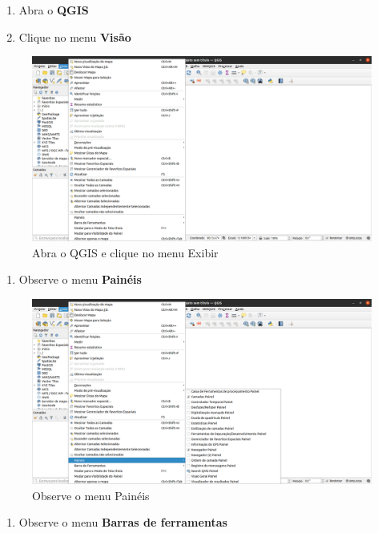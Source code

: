 \documentclass[
]{krantz}
\providecommand{\tightlist}{%
  \setlength{\itemsep}{0pt}\setlength{\parskip}{0pt}}
\begin{document}
\begin{enumerate}
\def\labelenumi{\arabic{enumi}.}
\tightlist
\item
  Abra o \textbf{QGIS}
\item
  Clique no menu \textbf{Visão}
\end{enumerate}

\begin{figure}
\centering
\includegraphics{media/modulo1/ex01-01.png}
\caption{Abra o QGIS e clique no menu Exibir}
\end{figure}

\begin{enumerate}
\def\labelenumi{\arabic{enumi}.}
\setcounter{enumi}{2}
\tightlist
\item
  Observe o menu \textbf{Painéis}
\end{enumerate}

\begin{figure}
\centering
\includegraphics{media/modulo1/ex01-02.png}
\caption{Observe o menu Painéis}
\end{figure}

\begin{enumerate}
\def\labelenumi{\arabic{enumi}.}
\setcounter{enumi}{3}
\tightlist
\item
  Observe o menu \textbf{Barras de ferramentas}
\end{enumerate}
\end{document}
